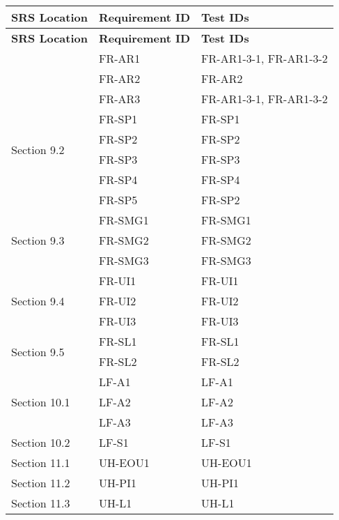 \documentclass[12pt, titlepage]{article}
\begin{document}
\begin{longtable}{|p{3cm}|p{4cm}|p{8cm}|}
  \hline
  \textbf{SRS Location} & \textbf{Requirement ID} & \textbf{Test IDs} \\
  \hline
  \endfirsthead

  \hline
  \textbf{SRS Location} & \textbf{Requirement ID} & \textbf{Test IDs} \\
  \hline
  \endhead

  \hline
  \endfoot

  \hline
  \endlastfoot

  \multirow{3}{3cm}{Section 9.1} & FR-AR1 & FR-AR1-3-1, FR-AR1-3-2 \\
  \cline{2-3}
  & FR-AR2 & FR-AR2 \\
  \cline{2-3}
  & FR-AR3 & FR-AR1-3-1, FR-AR1-3-2 \\
  \hline
  \multirow{4}{3cm}{Section 9.2} & FR-SP1 & FR-SP1 \\
  \cline{2-3}
  & FR-SP2 & FR-SP2 \\
  \cline{2-3}
  & FR-SP3 & FR-SP3 \\
  \cline{2-3}
  & FR-SP4 & FR-SP4 \\
  \cline{2-3}
  & FR-SP5 & FR-SP2 \\
  \hline
  \multirow{3}{3cm}{Section 9.3} & FR-SMG1 & FR-SMG1 \\
  \cline{2-3}
  & FR-SMG2 & FR-SMG2 \\
  \cline{2-3}
  & FR-SMG3 & FR-SMG3 \\
  \hline
  \multirow{3}{3cm}{Section 9.4} & FR-UI1 & FR-UI1 \\
  \cline{2-3}
  & FR-UI2 & FR-UI2 \\
  \cline{2-3}
  & FR-UI3 & FR-UI3 \\
  \hline
  \multirow{2}{3cm}{Section 9.5} & FR-SL1 & FR-SL1 \\
  \cline{2-3}
  & FR-SL2 & FR-SL2 \\
  \hline
  \multirow{3}{3cm}{Section 10.1} 
  & LF-A1 & LF-A1 \\
  \cline{2-3}
  & LF-A2 & LF-A2 \\
  \cline{2-3}
  & LF-A3 & LF-A3 \\
  \hline
  \multirow{1}{3cm}{Section 10.2} 
  & LF-S1 & LF-S1 \\
  \hline
  \multirow{1}{3cm}{Section 11.1} 
  & UH-EOU1 & UH-EOU1 \\
  \hline
  \multirow{1}{3cm}{Section 11.2} 
  & UH-PI1 & UH-PI1 \\
  \hline
  \multirow{1}{3cm}{Section 11.3} 
  & UH-L1 & UH-L1 \\

\end{longtable}
\end{document}
